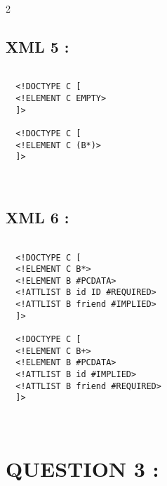 \documentclass[10pt]{article}
\newenvironment{DDbox}[1]{
\begin{lrbox}{\BBbox}\begin{minipage}{\linewidth}}
{\end{minipage}\end{lrbox}\noindent\colorbox{white}{\usebox{\BBbox}} \\
[.5cm]}
\begin{document}
  \begin{multicols}{2}

  \subsection{XML 5 :}

  \begin{DDbox}{\linewidth}
  \begin{lstlisting}

  <!DOCTYPE C [
  <!ELEMENT C EMPTY>
  ]>

  <!DOCTYPE C [
  <!ELEMENT C (B*)>
  ]>
\end{lstlisting}
\end{DDbox}

\subsection{XML 6 :}

\begin{DDbox}{\linewidth}
\begin{lstlisting}

  <!DOCTYPE C [
  <!ELEMENT C B*>
  <!ELEMENT B #PCDATA>
  <!ATTLIST B id ID #REQUIRED>
  <!ATTLIST B friend #IMPLIED>
  ]>

  <!DOCTYPE C [
  <!ELEMENT C B+>
  <!ELEMENT B #PCDATA>
  <!ATTLIST B id #IMPLIED>
  <!ATTLIST B friend #REQUIRED>
  ]>
\end{lstlisting}
\end{DDbox}
\end{multicols}
  \section{QUESTION 3 :}
\end{document}
